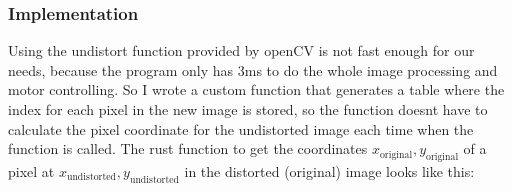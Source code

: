 \subsubsection{Implementation}\label{subsubsec:implementation}
Using the undistort function provided by openCV\autocite{opencv-undistort} is not fast enough for our needs, because the program only has 3ms to do the whole image processing and motor controlling.
So I wrote a custom function that generates a table where the index for each pixel in the new image is stored, so the function doesnt have to calculate the pixel coordinate for the undistorted image each time when the function is called.
The rust function to get the coordinates $x_{\text{original}},y_{\text{original}}$ of a pixel at $x_{\text{undistorted}},y_{\text{undistorted}}$ in the distorted (original) image looks like this:


